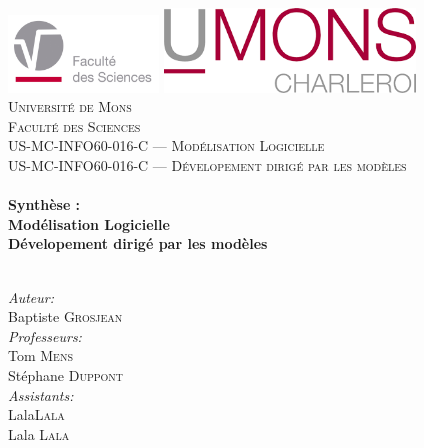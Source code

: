 

\begin{titlepage}

\begin{center}
\includegraphics[width=0.3\textwidth]{./Images/Logos/fs.pdf}\hfill
\includegraphics[width=0.5\textwidth]{./Images/Logos/umons_charleroi.png}\\[0.6cm]
\textsc{\LARGE Universit\'e de Mons}\\[0.4cm]
\textsc{\LARGE Facult\'e des Sciences}\\[1.5cm]
\textsc{\Large US-MC-INFO60-016-C — Modélisation Logicielle }\\[0.5cm]
\textsc{\Large US-MC-INFO60-016-C — Dévelopement dirigé par les modèles }\\[0.5cm]
\HRule \\[0.4cm]
{ \huge \bfseries Synthèse :}\\[0.2cm]
{ \huge \bfseries Modélisation Logicielle}\\[0.4cm]
{ \huge \bfseries Dévelopement dirigé par les modèles}\\[0.4cm]
\HRule \\[0.4cm]
\begin{minipage}{0.4\textwidth}
\begin{flushleft} \large
\emph{Auteur:}\\
Baptiste \textsc{Grosjean}\\
\emph{Professeurs:}\\
Tom \textsc{Mens}\\
Stéphane \textsc{Duppont}\\
\emph{Assistants:}\\
Lala\textsc{Lala}\\
Lala \textsc{Lala}\\
\end{flushleft}
\end{minipage}
\begin{minipage}{0.4\textwidth}

\end{minipage}
\end{center}
\end{titlepage}
